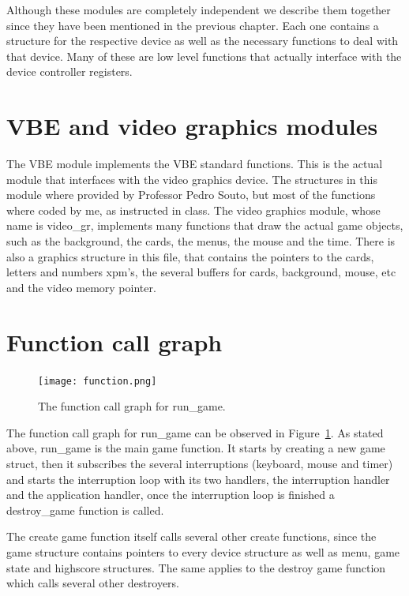 \documentclass[11pt,a4paper,reqno]{report}
\numberwithin{equation}{section}
\begin{document}
Although these modules are completely independent we describe them together since they have been mentioned in the previous chapter. Each one contains a structure for the respective device as well as the necessary functions to deal with that device. Many of these are low level functions that actually interface with the device controller registers.

\section{VBE and video graphics modules}

The VBE module implements the VBE standard functions. This is the actual module that interfaces with the video graphics device. The structures in this module where provided by Professor Pedro Souto, but most of the functions where coded by me, as instructed in class. The video graphics module, whose name is video\_gr, implements many functions that draw the actual game objects, such as the background, the cards, the menus, the mouse and the time. There is also a graphics structure in this file, that contains the pointers to the cards, letters and numbers xpm's, the several buffers for cards, background, mouse, etc and the video memory pointer.

\section{Function call graph}

\begin{figure}[htbp]
\begin{center}
\texttt{[image: function.png]}
\caption{The function call graph for run\_game.}
\label{function}
\end{center}
\end{figure}

The function call graph for run\_game can be observed in Figure~\ref{function}. As stated above, run\_game is the main game function. It starts by creating a new game struct, then it subscribes the several interruptions (keyboard, mouse and timer) and starts the interruption loop with its two handlers, the interruption handler and the application handler, once the interruption loop is finished a destroy\_game function is called. 

The create game function itself calls several other create functions, since the game structure contains pointers to every device structure as well as menu, game state and highscore structures. The same applies to the destroy game function which calls several other destroyers. 
\end{document}
